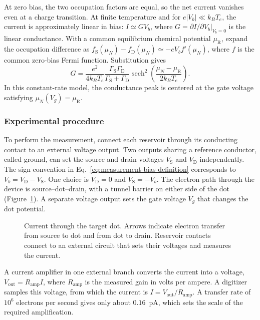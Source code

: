 At zero bias, the two occupation factors are equal, so the net
current vanishes even at a charge transition. At finite temperature
and for $e|V_b|\ll k_BT_e$, the current is approximately linear in
bias: $I\simeq GV_b$, where $G=\partial I/\partial V_b|_{V_b=0}$
is the linear conductance. With a common equilibrium chemical
potential $\mu_{\mathrm R}$, expand the occupation
difference as $f_{\mathrm S}(\mu_N)-f_{\mathrm D}(\mu_N)
\simeq-eV_b f'(\mu_N)$, where $f$ is the common zero-bias
Fermi function. Substitution gives
\begin{equation}
 G=\frac{e^2}{4k_BT_e}
     \frac{\Gamma_{\mathrm S}\Gamma_{\mathrm D}}
          {\Gamma_{\mathrm S}+\Gamma_{\mathrm D}}
     \operatorname{sech}^2\!\left(
                  \frac{\mu_N-\mu_{\mathrm R}}{2k_BT_e}\right).
 \label{eq:measurement-conductance-peak}
\end{equation}
In this constant-rate model, the conductance peak is centered at
the gate voltage satisfying $\mu_N(V_g)=\mu_{\mathrm R}$.

\subsubsection{Experimental procedure}
\label{sec:measurement-current-procedure}

To perform the measurement, connect each reservoir through its
conducting contact to an external voltage output. Two outputs
sharing a reference conductor, called ground, can set the source
and drain voltages $V_{\mathrm S}$ and $V_{\mathrm D}$ independently.
The sign convention in Eq.~\eqref{eq:measurement-bias-definition}
corresponds to $V_b=V_{\mathrm D}-V_{\mathrm S}$.
One choice is $V_{\mathrm D}=0$ and $V_{\mathrm S}=-V_b$.
The electron path through the device is source--dot--drain, with a
tunnel barrier on either side of the dot
(Figure~\ref{fig:measurement-transport-path}). A separate voltage
output sets the gate voltage $V_g$ that changes the dot potential.

\begin{figure}[htbp]
 \centering
 
 \caption{Current through the target dot. Arrows indicate electron
 transfer from source to dot and from dot to drain. Reservoir
 contacts connect to an external circuit that sets their voltages
 and measures the current.}
 \label{fig:measurement-transport-path}
\end{figure}

A current amplifier in one external branch converts the current
into a voltage, $V_{\mathrm{out}}=R_{\mathrm{amp}}I$, where
$R_{\mathrm{amp}}$ is the measured gain in volts per ampere.
A digitizer samples this voltage, from which the current is
$I=V_{\mathrm{out}}/R_{\mathrm{amp}}$. A transfer rate of $10^6$
electrons per second gives only about $0.16$~pA, which sets the
scale of the required amplification.

